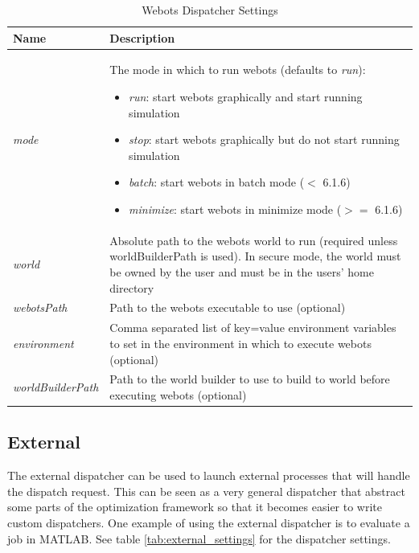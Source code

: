 \documentclass{report}
\begin{document}
\begin{table}[h!tb]\caption{Webots Dispatcher Settings}\label{tab:webots_settings}\vspace{0.1in}
	\centering

	\begin{tabular}{p{3cm} p{12cm}}
		\toprule
		\textbf{Name} & \textbf{Description} \\
		\midrule
		\textit{mode} & The mode in which to run webots (defaults to \textit{run}):
		\begin{itemize}
			\item \textit{run}: start webots graphically and start running simulation
			\item \textit{stop}: start webots graphically but do not start running simulation
			\item \textit{batch}: start webots in batch mode ($<$ 6.1.6)
			\item \textit{minimize}: start webots in minimize mode ($>=$ 6.1.6)
		\end{itemize} \\
		\textit{world} & Absolute path to the webots world to run (required
		                 unless worldBuilderPath is used). In secure mode, the
		                 world must be owned by the user and must be in
		the users' home directory \\
		\textit{webotsPath} & Path to the webots executable to use (optional) \\
		\textit{environment} & Comma separated list of key=value environment variables
		              to set in the environment in which to execute webots
		              (optional) \\
		\textit{worldBuilderPath} & Path to the world builder to use to build to world
		                   before executing webots (optional) \\
		\bottomrule
	\end{tabular}
\end{table}

\subsection{External}
The external dispatcher can be used to launch external processes that will
handle the dispatch request. This can be seen as a very general dispatcher that
abstract some parts of the optimization framework so that it becomes easier
to write custom dispatchers. One example of using the external dispatcher is
to evaluate a job in MATLAB. See table \ref{tab:external_settings} for
the dispatcher settings.
\end{document}
